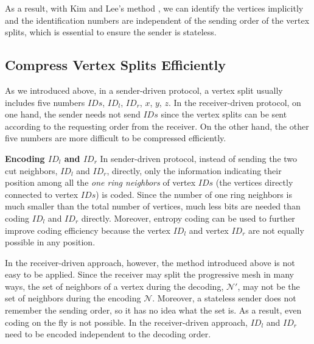     As a result, with Kim and Lee's method \cite{kim01truly}, we can identify the vertices
    implicitly and the identification numbers are independent of the sending order of the 
    vertex splits, which is essential to ensure the sender is stateless.

    \subsection{Compress Vertex Splits Efficiently}
    As we introduced above, in a sender-driven protocol, 
    a vertex split usually includes five numbers {$IDs$, $ID_l$, $ID_r$,
    $x$, $y$, $z$}. 
    In the receiver-driven protocol, on one hand, the sender needs not send
    $IDs$ since the vertex splits can be sent according to
    the requesting order from the receiver. On the other hand, the other 
    five numbers are more difficult to be compressed efficiently.
    
    \textbf{Encoding $ID_l$ and $ID_r$}
    In sender-driven protocol, instead of sending the two cut neighbors, $ID_l$ and $ID_r$, directly,
    only the information indicating their position among all the \emph{one ring neighbors}
    of vertex $IDs$ (the vertices directly connected to vertex $IDs$) is coded.  
    Since the number of one ring neighbors is much smaller than the total number of vertices,
    much less bits are needed than coding $ID_l$ and $ID_r$ directly. Moreover, entropy coding
    can be used to further improve coding efficiency because the vertex $ID_l$ and vertex $ID_r$
    are not equally possible in any position.

    In the receiver-driven approach, however, the method introduced above is not easy to be applied.
    Since the receiver may split the progressive mesh in many ways, the set of neighbors of 
    a vertex during the decoding, $\mathcal{N}'$, 
    may not be the set of neighbors during the encoding $\mathcal{N}$.
    Moreover, a stateless sender does not remember the sending
    order, so it has no idea what the set is. 
    As a result, even coding on the fly is not possible. 
    In the receiver-driven approach, $ID_l$ and $ID_r$ need to be encoded independent to the decoding order. 

